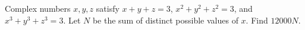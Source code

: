 Complex numbers $x,y,z$ satisfy $x+y+z=3$, $x^2+y^2+z^2=3$, and $x^3+y^3+z^3=3$. Let $N$ be the sum of distinct possible values of $x$. Find $12000N$.
